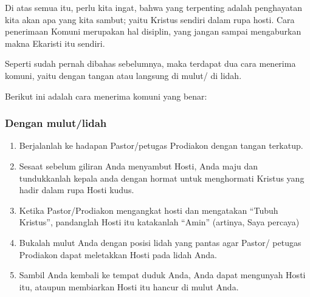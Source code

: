 Di atas semua itu, perlu kita ingat, bahwa yang terpenting adalah penghayatan kita akan apa yang kita sambut; yaitu Kristus sendiri dalam rupa hosti. Cara penerimaan Komuni merupakan hal disiplin, yang jangan sampai mengaburkan makna Ekaristi itu sendiri. 

Seperti sudah pernah dibahas sebelumnya, maka terdapat dua cara menerima komuni, yaitu dengan tangan atau langsung di mulut/ di lidah.

Berikut ini adalah cara menerima komuni yang benar:

\subsubsection*{Dengan mulut/lidah}
\begin{enumerate}
\item        Berjalanlah ke hadapan Pastor/petugas Prodiakon dengan tangan terkatup.
\item        Sesaat sebelum giliran Anda menyambut Hosti, Anda maju dan tundukkanlah kepala anda dengan hormat untuk menghormati Kristus yang hadir dalam rupa Hosti kudus.
\item        Ketika Pastor/Prodiakon mengangkat hosti dan mengatakan “Tubuh Kristus”, pandanglah Hosti itu katakanlah “Amin” (artinya, Saya percaya)
\item        Bukalah mulut Anda dengan posisi lidah yang pantas agar Pastor/ petugas Prodiakon dapat meletakkan Hosti pada lidah Anda.
\item        Sambil Anda kembali ke tempat duduk Anda, Anda dapat mengunyah Hosti itu, ataupun membiarkan Hosti itu hancur di mulut Anda.
\end{enumerate}

